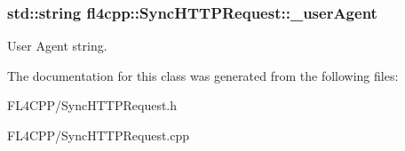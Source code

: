 \subsubsection[{\texorpdfstring{\+\_\+user\+Agent}{_userAgent}}]{\setlength{\rightskip}{0pt plus 5cm}std\+::string fl4cpp\+::\+Sync\+H\+T\+T\+P\+Request\+::\+\_\+user\+Agent\hspace{0.3cm}{\ttfamily [protected]}}\hypertarget{classfl4cpp_1_1_sync_h_t_t_p_request_a0c9401465b3280620964c05986952e82}{}\label{classfl4cpp_1_1_sync_h_t_t_p_request_a0c9401465b3280620964c05986952e82}
User Agent string. 

The documentation for this class was generated from the following files\+:\begin{DoxyCompactItemize}
\item 
F\+L4\+C\+P\+P/Sync\+H\+T\+T\+P\+Request.\+h\item 
F\+L4\+C\+P\+P/Sync\+H\+T\+T\+P\+Request.\+cpp\end{DoxyCompactItemize}
